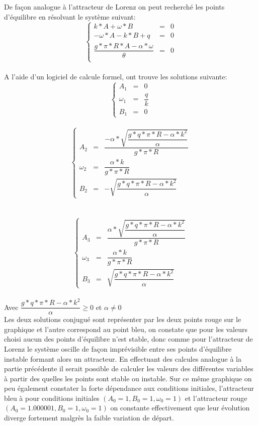 De façon analogue à l'attracteur de Lorenz on peut recherché les points d'équilibre en résolvant le système suivant:\\
\[
    \left\{
    \begin{array}{rcl}
        k*A+\omega*B&=&0\\
        -\omega*A-k*B+q&=&0\\
        \dfrac{g*\pi*R*A-\alpha*\omega}{\theta }&=&0\\
    \end{array}
    \right.
\]\\

A l'aide d'un logiciel de calcule formel, ont trouve les solutions suivante:\\
\[
    \left\{
    \begin{array}{rcl}
        A_1&=&0\\
        \omega_1&=&\dfrac{q}{k}\\
        B_1&=&0

    \end{array}
    \right.
\]\\

\[
    \left\{
    \begin{array}{rcl}
        A_2&=&\dfrac{-\alpha*\sqrt{\dfrac{g*q*\pi*R-\alpha*k^2}{\alpha}}}{g*\pi*R}\\
        \omega_2&=&\dfrac{\alpha*k}{g*\pi*R}\\
        B_2&=&-\sqrt{\dfrac{g*q*\pi*R-\alpha*k^2}{\alpha}}

    \end{array}
    \right.
\]\\
\\
\[
    \left\{
    \begin{array}{rcl}
        A_3&=&\dfrac{\alpha*\sqrt{\dfrac{g*q*\pi*R-\alpha*k^2}{\alpha}}}{g*\pi*R}\\
        \omega_3&=&\dfrac{\alpha*k}{g*\pi*R}\\
        B_3&=&\sqrt{\dfrac{g*q*\pi*R-\alpha*k^2}{\alpha}}

    \end{array}
    \right.
\]\\

Avec $\dfrac{g*q*\pi*R-\alpha*k^2}{\alpha} \geq 0$ et $\alpha\neq 0$\\

Les deux solutions conjugué sont représenter par les deux points rouge sur le graphique et l'autre correspond au point bleu, on constate que pour les valeurs choisi aucun des points d'équilibre n'est stable, donc comme pour l'attracteur de Lorenz le système oscille de façon imprévisible entre ses points d'équilibre instable formant alors un attracteur. En effectuant des calcules analogue à la partie précédente il serait possible de calculer les valeurs des différentes variables à partir des quelles les points sont stable ou instable. 
Sur ce même graphique on peu également constater la forte dépendance aux conditions initiales, l'attracteur bleu à pour conditions initiales $(A_0=1,B_0=1,\omega_0=1)$ et l'attracteur rouge $(A_0=1.000001,B_0=1,\omega_0=1)$ on constante effectivement que leur évolution diverge fortement malgrès la faible variation de départ.


